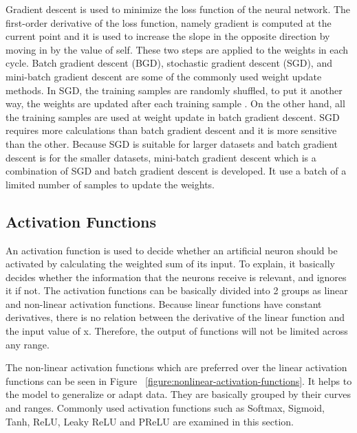         Gradient descent is used to minimize the loss function of the neural network.
        The first-order derivative of the loss function, namely gradient is computed at the current point and it is used to increase the slope in the opposite direction by moving in by the value of self.
        These two steps are applied to the weights in each cycle.
        Batch gradient descent (BGD), stochastic gradient descent (SGD), and mini-batch gradient descent are some of the commonly used weight update methods.
        In SGD, the training samples are randomly shuffled, to put it another way, the weights are updated after each training sample \cite{bottou2010large}.
        On the other hand, all the training samples are used at weight update in batch gradient descent.
        SGD requires more calculations than batch gradient descent and it is more sensitive than the other.
        Because SGD is suitable for larger datasets and batch gradient descent is for the smaller datasets, mini-batch gradient descent which is a combination of SGD and batch gradient descent is developed.
        It use a batch of a limited number of samples to update the weights.

    \subsection{Activation Functions}

        An activation function is used to decide whether an artificial neuron should be activated by calculating the weighted sum of its input.
        To explain, it basically decides whether the information that the neurons receive is relevant, and ignores it if not.
        The activation functions can be basically divided into 2 groups as linear and non-linear activation functions.
        Because linear functions have constant derivatives, there is no relation between the derivative of the linear function and the input value of x.
        Therefore, the output of functions will not be limited across any range.

        

        The non-linear activation functions which are preferred over the linear activation functions can be seen in Figure ~\ref{figure:nonlinear-activation-functions}.
        It helps to the model to generalize or adapt data. They are basically grouped by their curves and ranges.
        Commonly used activation functions such as Softmax, Sigmoid, Tanh, ReLU, Leaky ReLU and PReLU are examined in this section.

